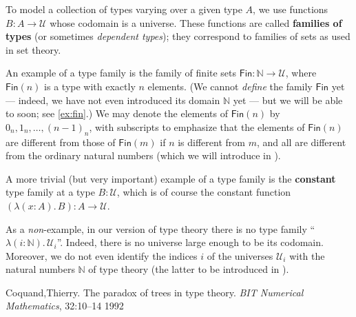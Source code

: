 \documentclass[12pt]{article}
\def\index#1{}
\def\indexdef#1{}
\def\indexsee#1#2{}
\def\symlabel#1{}
\def\define#1{\textbf{#1}}
\newcommand{\N}{\ensuremath{\mathbb{N}}\xspace}
\let\nat\N
\newcommand{\UU}{\ensuremath{\mathcal{U}}\xspace}
\newcommand{\Fin}{\ensuremath{\mathsf{Fin}}}
\def\lam#1{{\lambda}(#1){.\,}}
\begin{document}
To model a collection of types varying over a given type $A$, we use functions $B : A \to \UU$  whose
codomain is a universe. These functions are called
\define{families of types} (or sometimes \emph{dependent types});
\indexsee{family!of types}{type, family of}%
\indexdef{type!family of}%
\indexsee{type!dependent}{type, family of}%
\indexsee{dependent!type}{type, family of}%
they correspond to families of sets as used in
set theory.

\symlabel{fin}%
An example of a type family is the family of finite sets $\Fin
: \nat \to \UU$, where $\Fin(n)$ is a type with exactly $n$ elements.
(We cannot \emph{define} the family $\Fin$ yet --- indeed, we have not even introduced its domain $\nat$ yet --- but we will be able to soon; see \autoref{ex:fin}.)
We may denote the elements of $\Fin(n)$ by $0_n,1_n,\dots,(n-1)_n$, with subscripts to emphasize that the elements of $\Fin(n)$ are different from those of $\Fin(m)$ if $n$ is different from $m$, and all are different from the ordinary natural numbers (which we will introduce in ).
\index{finite!sets, family of}%

A more trivial (but very important) example of a type family is the \define{constant} type family
\indexdef{constant!type family}%
\indexdef{type!family of!constant}%
at a type $B:\UU$, which is of course the constant function $(\lam{x:A} B):A\to\UU$.

As a \emph{non}-example, in our version of type theory there is no type family ``$\lam{i:\nat} \UU_i$''.
Indeed, there is no universe large enough to be its codomain.
Moreover, we do not even identify the indices $i$ of the universes $\UU_i$ with the natural numbers \nat of type theory (the latter to be introduced in ).

\index{type!universe|)}%

\begin{thebibliography}{99}

 {Coquand,Thierry}. {The paradox of trees in type theory}. \emph{BIT Numerical Mathematics}, {32}:{10--14} {1992}

\end{thebibliography}
\end{document}
